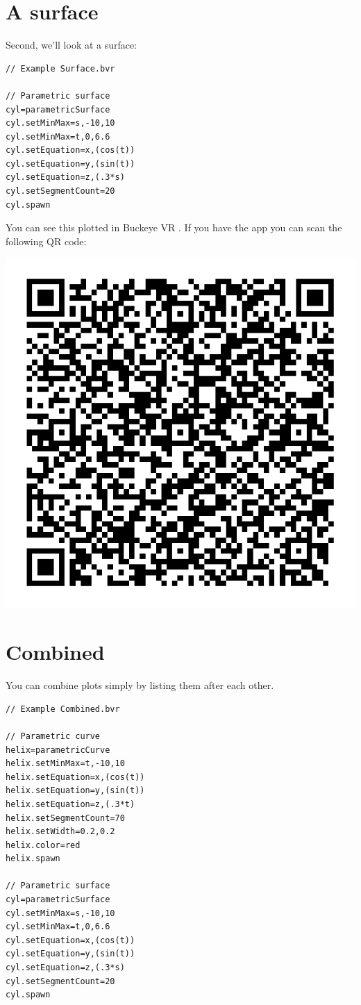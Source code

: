 \documentclass{ximera}
\begin{document}
\section{A surface}

Second, we'll look at a surface:

\begin{verbatim}
// Example Surface.bvr

// Parametric surface
cyl=parametricSurface
cyl.setMinMax=s,-10,10
cyl.setMinMax=t,0,6.6
cyl.setEquation=x,(cos(t))
cyl.setEquation=y,(sin(t))
cyl.setEquation=z,(.3*s)
cyl.setSegmentCount=20
cyl.spawn
\end{verbatim}

You can see this plotted in Buckeye VR
.
If you have the app you can scan the following QR code:
\begin{image}
\includegraphics{bvrQR2.png}  
\end{image}

\section{Combined}

You can combine plots simply by listing them after each other.

\begin{verbatim}
// Example Combined.bvr

// Parametric curve
helix=parametricCurve
helix.setMinMax=t,-10,10
helix.setEquation=x,(cos(t))
helix.setEquation=y,(sin(t))
helix.setEquation=z,(.3*t)
helix.setSegmentCount=70
helix.setWidth=0.2,0.2
helix.color=red
helix.spawn

// Parametric surface
cyl=parametricSurface
cyl.setMinMax=s,-10,10
cyl.setMinMax=t,0,6.6
cyl.setEquation=x,(cos(t))
cyl.setEquation=y,(sin(t))
cyl.setEquation=z,(.3*s)
cyl.setSegmentCount=20
cyl.spawn
\end{verbatim}
\end{document}
